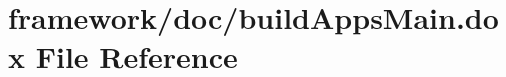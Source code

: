 \hypertarget{build_apps_main_8dox}{}\section{framework/doc/build\+Apps\+Main.dox File Reference}
\label{build_apps_main_8dox}

